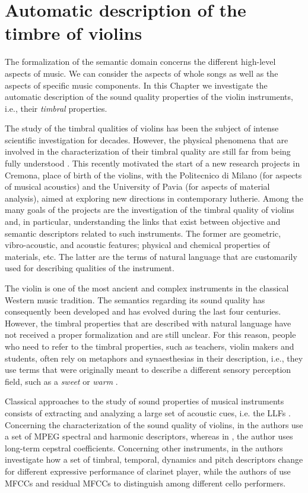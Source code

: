 \chapter{Automatic description of the timbre of violins}
\label{Chap:Violin}
The formalization of the semantic domain concerns the different high-level aspects of music. We can consider the aspects of whole songs as well as the aspects of specific music components. In this Chapter we investigate the automatic description of the sound quality properties of the violin instruments, i.e., their \textit{timbral} properties. 

The study of the timbral qualities of violins has been the subject of intense scientific investigation \cite{Woodhouse2014} for decades. However, the physical phenomena that are involved in the characterization of their timbral quality are still far from being fully understood \cite{Zanoni2014}. This recently motivated the start of a new research projects in Cremona, place of birth of the violins, with the Politecnico di Milano (for aspects of musical acoustics) and the University of Pavia (for aspects of material analysis), aimed at exploring new directions in contemporary lutherie. Among the many goals of the projects are the investigation of the timbral quality of violins and, in particular, understanding the links that exist between objective and semantic descriptors related to such instruments. The former are geometric, vibro-acoustic, and acoustic features; physical and chemical properties of materials, etc. The latter are the terms of natural language that are customarily used for describing qualities of the instrument. 

The violin is one of the most ancient and complex instruments in the classical Western music tradition. The semantics regarding its sound quality has consequently been developed and has evolved during the last four centuries. However, the timbral properties that are described with natural language have not received a proper formalization and are still unclear. For this reason, people who need to refer to the timbral properties, such as teachers, violin makers and students, often rely on metaphors and synaesthesias in their description, i.e., they use terms that were originally meant to describe a different sensory perception field, such as a \textit{sweet} or \textit{warm} \cite{Zanoni2014}.

Classical approaches to the study of sound properties of musical instruments consists of extracting and analyzing a large set of acoustic cues, i.e. the LLFs \cite{Kim2005}. Concerning the characterization of the sound quality of violins, in \cite{Kaminiarz2007,Charles2006} the authors use a set of MPEG spectral and harmonic descriptors, whereas in \cite{Lukasik2010}, the author uses long-term cepstral coefficients. Concerning other instruments, in \cite{Barthet2010} the authors investigate how a set of timbral, temporal, dynamics and pitch descriptors change for different expressive performance of clarinet player, while the authors of \cite{percival2013physical} use MFCCs and residual MFCCs to distinguish among different cello performers.

